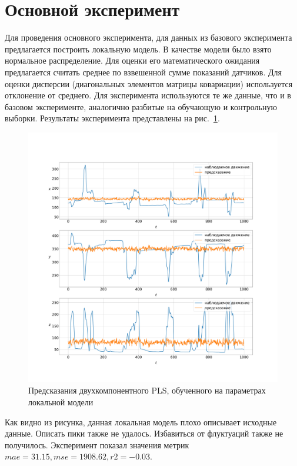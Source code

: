 \section{Основной эксперимент}
Для проведения основного эксперимента, для данных из базового эксперимента предлагается построить локальную модель. В качестве модели было взято нормальное распределение. Для оценки его математического ожидания предлагается считать среднее по взвешенной сумме показаний датчиков. Для оценки дисперсии (диагональных элементов матрицы ковариации) используется отклонение от среднего. Для эксперимента используются те же данные, что и в базовом эксперименте, аналогично разбитые на обучающую и контрольную выборки. Результаты эксперимента представлены на рис.~\ref{fig:mainAlgo}.
\begin{figure}
  \begin{center}
    \includegraphics[width=\textwidth]{main_algo.pdf}
    \caption{Предсказания двухкомпонентного PLS, обученного на параметрах локальной модели}
    \label{fig:mainAlgo}
  \end{center}
\end{figure}
Как видно из рисунка, данная локальная модель плохо описывает исходные данные. Описать пики также не удалось. Избавиться от флуктуаций также не получилось. Эксперимент показал значения метрик $mae = 31.15, mse = 1908.62, r2 = -0.03$.

